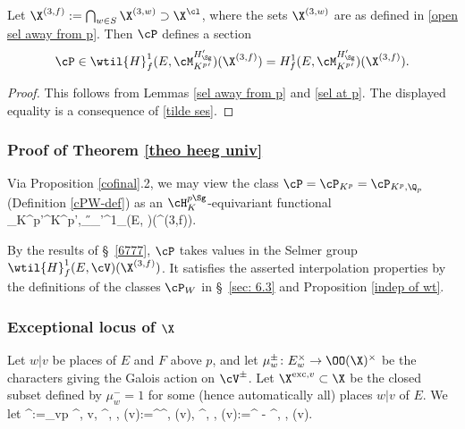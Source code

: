 \begin{coro}\label{X3f} Let $\X^{(3, f)}:=\bigcap_{w\in S} \X^{(3,w)}\supset \X^{\cl}$, where the sets $\X^{(3, w)}$ are as defined  in \eqref{open sel away from p}. Then $\cP$ defines a section
$$
\cP\in \wtil{H}^{1}_{f}(E,  \cM_{K^{p}{}'}^{{H_{\Sg}'}}) (\X^{(3, f)})=
H^{1}_{f}({E},  \cM_{K^{p}{}'}^{{H_{\Sg}'}})  (\X^{(3, f)}).$$
\end{coro}

\begin{proof} This follows from Lemmas \ref{sel away from p} and  \ref{sel at p}. The displayed equality is a consequence of  \eqref{tilde ses}.
\end{proof}




\subsubsection{Proof of Theorem \ref{theo heeg univ}} 
Via Proposition \ref{cofinal}.2,  we may view the class $\cP=\cP_{K^{p}}=\cP_{K^{p}, \Q_{p}}$  (Definition \ref{cPW-def}) as an $\cH_{K}^{p\Sg}$-equivariant  functional
\beq \label{cP as functional} \cP_{K^{p}{}'}\colon \Pi^{K^{p}{}',\ord}_{\H_{\Sg'}}^{1}_{}(E, \cV)(\X^{(3,f)}).
\eeq

By the  results of \S~\ref{6777},   $\cP$ takes values in  the Selmer group $\wtil{H}^{1}_{f}(E, \cV)(\X^{(3,f)})$.
  It satisfies the asserted interpolation properties by the definitions of the classes $\cP_{W}$ in \S~\ref{sec: 6.3} and Proposition \ref{indep of wt}.



\subsubsection{Exceptional locus of $\X$} 
  Let $w|v$ be places of $E$ and $F$ above $p$, and let $\mu_{w}^{\pm}\colon E_{w}^{\times}\to \OO(\X)^{\times}$ be the characters giving the Galois action on $\cV^{\pm}$. Let $\X^{{\rm exc},v }\subset \X$ be the closed subset defined by $\mu_{w}^{-}=1$ for some (hence automatically all) places $w\vert v$ of $E$. We let
\beq\label{exc sets}
\X^{\exc}:=\bigcup_{v\vert p} \X^{\exc, v}, \quad \X^{\cl, \exc, (v)}:=\X^{\cl}\cap \X^{\exc, (v)}, \quad  \X^{\cl,{} , (v)}:=\X^{\cl} - \X^{\cl, \exc, (v)}.
\eeq


